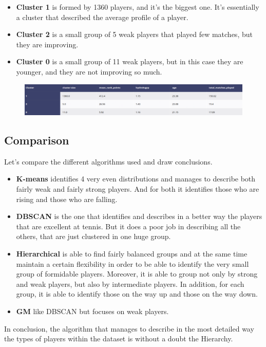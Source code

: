 \documentclass{article}
\begin{document}
\begin{itemize}
    \item{ \textbf{Cluster 1} is formed by 1360 players, and it's the biggest one. It's essentially a cluster that described the average profile of a player.}
    \item{ \textbf{Cluster 2} is a small group of 5 weak players that played few matches, but they are improving.}
    \item{\textbf{Cluster 0} is a small group of 11 weak players, but in this case they are younger, and they are not improving so much.}
\end{itemize}

\begin{figure}[h]
\centering
\includegraphics[width=.6\textwidth]{plots/gaussian_mixture//gm_results}
\label{fig:gm_results}
\end{figure}

\subsection{Comparison}
Let's compare the different algorithms used and draw conclusions.

\begin{itemize}
    \item{ \textbf{K-means} identifies 4 very even distributions and manages to describe both fairly weak and fairly strong players. And for both it identifies those who are rising and those who are falling.  }
    \item{ \textbf{DBSCAN} is the one that identifies and describes in a better way the players that are excellent at tennis. But it does a poor job in describing all the others, that are just clustered in one huge group.}
    \item{\textbf{Hierarchical} is able to find fairly balanced groups and at the same time maintain a certain flexibility in order to be able to identify the very small group of formidable players. Moreover, it is able to group not only by strong and weak players, but also by intermediate players. In addition, for each group, it is able to identify those on the way up and those on the way down.}
    \item{\textbf{GM}} like DBSCAN but focuses on weak players.
\end{itemize}

In conclusion, the algorithm that manages to describe in the most detailed way the types of players within the dataset is without a doubt the Hierarchy.
\end{document}
